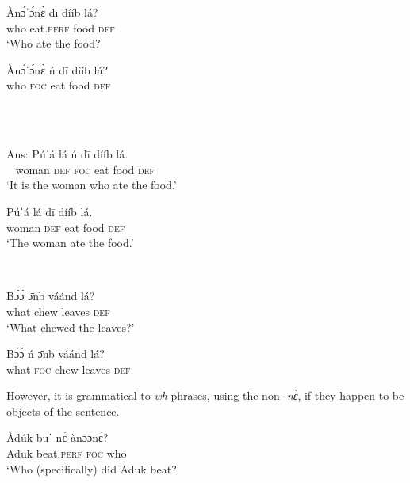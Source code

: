 \documentclass[output=paper,modfonts,nonflat,
\ChapterDOI{10.5281/zenodo.3367154}
 hidelinks
]{langsci/langscibook}
\begin{document}
{%
\noindent
      \parbox[t]{6.5cm}{
      \ea
      \gll Àn\'{ɔ}ˈ\'{ɔ}n\`{ɛ}   d\={i}     dííb  lá?     \\
	   who           eat.\textsc{perf}   food   \textsc{def}    \\
      \glt ‘Who ate the food?                            
      \z
      }
      \parbox[t]{5.5cm}{
      \ea\label{ex:abubakari:fnii}
      \gll *Àn\'{ɔ}ˈ\'{ɔ}n\`{ɛ}   ń   d\={i}   dííb  lá?    \\
      who                   \textsc{foc}  eat  food   \textsc{def}                            \\
      \glt ~
      \z
      }\\
      \parbox[t]{6.5cm}{     
      \ea
      \gll Ans: Púˈá     lá           ń    d\={i}   dííb  lá. \\
     ~          woman  \textsc{def}  \textsc{foc}  eat  food   \textsc{def} \\
      \glt ‘It is the woman who ate the food.’                          
      \z
      }\parbox[t]{5.5cm}{
      \ea\label{ex:abubakari:fniv}
      \gll Púˈá   lá   d\={i}   dííb  lá.\\
      woman  \textsc{def}   eat  food   \textsc{def}        \\
      \glt ‘The woman ate the food.’                              
      \z
      }\\
      \parbox[t]{6.5cm}{
      \ea
      \gll B\'{ɔ}\'{ɔ}   \={ɔ}nb  váánd  lá?     \\
      what  chew   leaves   \textsc{def}         \\
      \glt ‘What chewed the leaves?’        
      \z
      }\parbox[t]{5.5cm}{
      \ea\label{ex:abubakari:fnvi}
      \gll *B\'{ɔ}\'{ɔ}   ń   \={ɔ}nb  váánd  lá?     \\
      what   \textsc{foc}  chew   leaves   \textsc{def}\\
      \z 
      }
      
    However, it is grammatical to  \textit{wh}-phrases, using the non-  \textit{nɛ́}, if they happen to be objects of the sentence.  
    
 
    \ea 
    \gll Àdúk  b\={u}ˈ    nɛ́  ànɔɔn\`{ɛ}? \\ 
    Aduk  beat.\textsc{perf}   \textsc{foc}  who       \\
    \glt ‘Who (specifically) did Aduk beat?       
    \z
    
}
\end{document}
